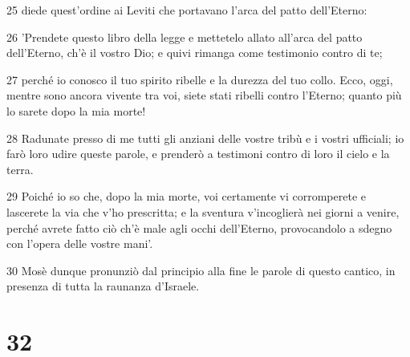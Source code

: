 \par 25 diede quest'ordine ai Leviti che portavano l'arca del patto dell'Eterno:
\par 26 'Prendete questo libro della legge e mettetelo allato all'arca del patto dell'Eterno, ch'è il vostro Dio; e quivi rimanga come testimonio contro di te;
\par 27 perché io conosco il tuo spirito ribelle e la durezza del tuo collo. Ecco, oggi, mentre sono ancora vivente tra voi, siete stati ribelli contro l'Eterno; quanto più lo sarete dopo la mia morte!
\par 28 Radunate presso di me tutti gli anziani delle vostre tribù e i vostri ufficiali; io farò loro udire queste parole, e prenderò a testimoni contro di loro il cielo e la terra.
\par 29 Poiché io so che, dopo la mia morte, voi certamente vi corromperete e lascerete la via che v'ho prescritta; e la sventura v'incoglierà nei giorni a venire, perché avrete fatto ciò ch'è male agli occhi dell'Eterno, provocandolo a sdegno con l'opera delle vostre mani'.
\par 30 Mosè dunque pronunziò dal principio alla fine le parole di questo cantico, in presenza di tutta la raunanza d'Israele.

\chapter{32}

